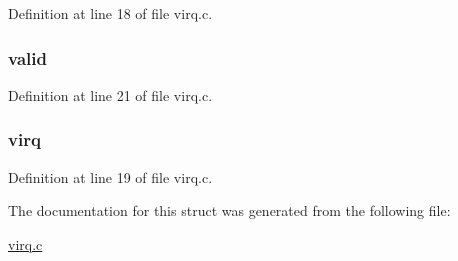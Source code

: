 \-Definition at line 18 of file virq.\-c.

\hypertarget{structvirq__entry_a75adb1881fa5da948723d7b8807b78cd}{
\subsubsection[{valid}]{ {\bf valid}}}\label{structvirq__entry_a75adb1881fa5da948723d7b8807b78cd}


\-Definition at line 21 of file virq.\-c.

\hypertarget{structvirq__entry_a76a7da8e942ab20e51e638d71b9735db}{
\subsubsection[{virq}]{ {\bf virq}}}\label{structvirq__entry_a76a7da8e942ab20e51e638d71b9735db}


\-Definition at line 19 of file virq.\-c.



\-The documentation for this struct was generated from the following file\-:\begin{DoxyCompactItemize}
\item 
\hyperlink{virq_8c}{virq.\-c}\end{DoxyCompactItemize}
